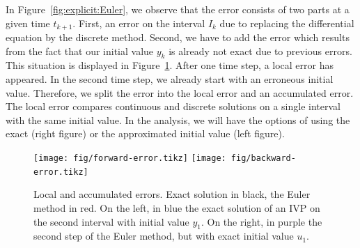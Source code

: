 \begin{remark}
  In Figure~\ref{fig:explicit:Euler}, we observe that the error
  consists of two parts at a given time $t_{k+1}$. First, an error on
  the interval $I_k$ due to replacing the differential equation by the
  discrete method. Second, we have to add the error which results from
  the fact that our initial value $y_k$ is already not exact due to
  previous errors. This situation is displayed in
  Figure~\ref{fig:forward-errors}. After one time step, a local error
  has appeared. In the second time step, we already start with an
  erroneous initial value. Therefore, we split the error into the
  local error and an accumulated error. The local error compares
  continuous and discrete solutions on a single interval with the same
  initial value. In the analysis, we will have the options of using
  the exact (right figure) or the approximated initial value (left figure).

  \begin{figure}[tp]
    \centering
    \texttt{[image: fig/forward-error.tikz]}
    \texttt{[image: fig/backward-error.tikz]}
    \caption{Local and accumulated errors. Exact solution in black,
      the Euler method in red. On the left, in blue the exact solution
      of an IVP on the second interval with initial value $y_1$. On
      the right, in purple the second step of the Euler method, but with
      exact initial value $u_1$.}
    \label{fig:forward-errors}
  \end{figure}
\end{remark}






